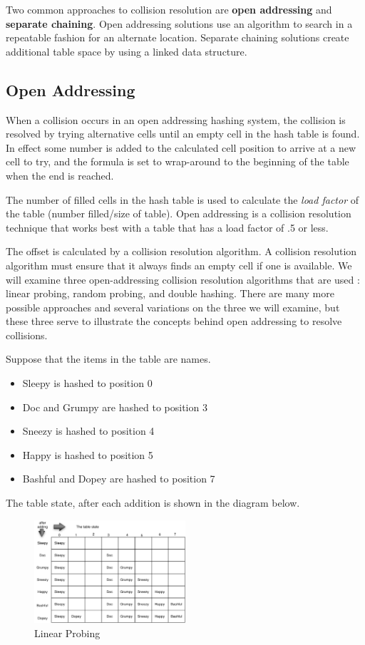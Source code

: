 Two common approaches to collision resolution are \textbf{open addressing} and \textbf{separate chaining}.  Open addressing solutions use an algorithm to search in a repeatable fashion for an alternate location.   Separate chaining solutions create additional table space by using a linked data structure.

\subsection{Open Addressing}

     When a collision occurs in an open addressing hashing system, the collision is resolved by trying alternative cells until an empty cell in the hash table is found. In effect some number is added to the calculated cell position to arrive at a new cell to try, and the formula is set to wrap-around to the beginning of the table when the end is reached.
   
     The number of filled cells in the hash table is used to calculate the \textit{load factor} of the table (number filled/size of table). Open addressing is a collision resolution technique that works best with a table that has a load factor of .5 or less.
   
     The offset is calculated by a collision resolution algorithm. A collision resolution algorithm must ensure that it always finds an empty cell if one is available. We will examine three open-addressing collision resolution algorithms that are used : linear probing, random probing, and double hashing.   There are many more possible approaches and several variations on the three we will examine, but these three serve to illustrate the concepts behind open addressing to resolve collisions.
   
Suppose that the items in the table are names.
\begin{itemize}
\item Sleepy is hashed to position 0
\item Doc and Grumpy are hashed to position 3
\item Sneezy is hashed to position 4
\item Happy is hashed to position 5
\item Bashful and Dopey are hashed to position 7
\end{itemize}



The table state, after each addition is shown in the diagram below.


\begin{figure}[H]
\centering
\includegraphics[width=0.5\textwidth]{pictures/Linear_Probing_0.png}
\caption{Linear Probing}
\label{fig:linearProb}
\end{figure}


